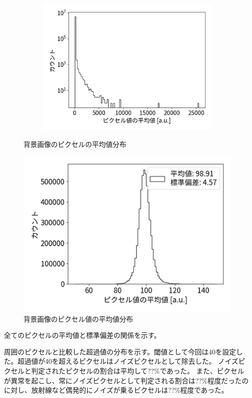 \documentclass[a4paper,11pt,uplatex]{jsbook}
\begin{document}
\begin{figure}[b]
\begin{subfigure}[b]{0.33\linewidth}
    \includegraphics[width=\linewidth]{image/4-BGmeanall.png}
  \end{subfigure}
  \caption[背景画像の光量分布]{背景画像のピクセルの平均値分布}
\end{figure}



\begin{figure}
  \centering
  \includegraphics[width=0.8\linewidth]{image/4-BGmean.png}
  \caption{背景画像のピクセル値の平均値分布}\label{BGmean}
\end{figure}


全てのピクセルの平均値と標準偏差の関係を示す。

周囲のピクセルと比較した超過値の分布を示す。閾値として今回は40を設定した。超過値が40を超えるピクセルはノイズピクセルとして除去した。
ノイズピクセルと判定されたピクセルの割合は平均して??\%であった。
また、ピクセルが異常を起こし、常にノイズピクセルとして判定される割合は??\%程度だったのに対し、放射線など偶発的にノイズが乗るピクセルは??\%程度であった。
\end{document}
